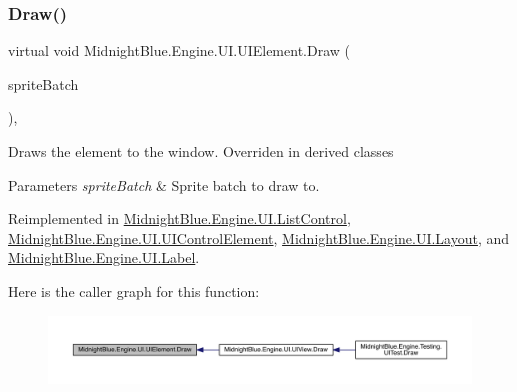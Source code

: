 \subsubsection{\texorpdfstring{Draw()}{Draw()}}
{\footnotesize\ttfamily virtual void Midnight\+Blue.\+Engine.\+U\+I.\+U\+I\+Element.\+Draw (\begin{DoxyParamCaption}\item[{Sprite\+Batch}]{sprite\+Batch }\end{DoxyParamCaption})\hspace{0.3cm}{\ttfamily [inline]}, {\ttfamily [virtual]}}



Draws the element to the window. Overriden in derived classes 


\begin{DoxyParams}{Parameters}
{\em sprite\+Batch} & Sprite batch to draw to.\\
\hline
\end{DoxyParams}


Reimplemented in \hyperlink{class_midnight_blue_1_1_engine_1_1_u_i_1_1_list_control_a2f1c5c5f59bfc8c1850d8f3d29334781}{Midnight\+Blue.\+Engine.\+U\+I.\+List\+Control}, \hyperlink{class_midnight_blue_1_1_engine_1_1_u_i_1_1_u_i_control_element_ab279864be71adda238d2a54648ae237e}{Midnight\+Blue.\+Engine.\+U\+I.\+U\+I\+Control\+Element}, \hyperlink{class_midnight_blue_1_1_engine_1_1_u_i_1_1_layout_a79151b83463cab0debd506caf8e46bff}{Midnight\+Blue.\+Engine.\+U\+I.\+Layout}, and \hyperlink{class_midnight_blue_1_1_engine_1_1_u_i_1_1_label_a9ec463bec9d804cd92ec889b002619f6}{Midnight\+Blue.\+Engine.\+U\+I.\+Label}.

Here is the caller graph for this function\+:
\nopagebreak
\begin{figure}[H]
\begin{center}
\leavevmode
\includegraphics[width=350pt]{class_midnight_blue_1_1_engine_1_1_u_i_1_1_u_i_element_a0faa27f642478cd428c4718f66263325_icgraph}
\end{center}
\end{figure}
\hypertarget{class_midnight_blue_1_1_engine_1_1_u_i_1_1_u_i_element_ae92b745064ca9810ce516d884f701e0e}{}\label{class_midnight_blue_1_1_engine_1_1_u_i_1_1_u_i_element_ae92b745064ca9810ce516d884f701e0e} 
